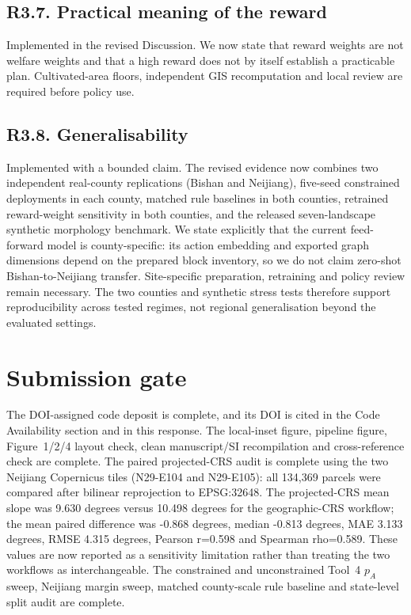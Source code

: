 ﻿\documentclass[11pt]{article}
\begin{document}
\subsection*{R3.7. Practical meaning of the reward}
Implemented in the revised Discussion. We now state that reward weights are not welfare weights and that a high reward does not by itself establish a practicable plan. Cultivated-area floors, independent GIS recomputation and local review are required before policy use.

\subsection*{R3.8. Generalisability}
Implemented with a bounded claim. The revised evidence now combines two independent real-county replications (Bishan and Neijiang), five-seed constrained deployments in each county, matched rule baselines in both counties, retrained reward-weight sensitivity in both counties, and the released seven-landscape synthetic morphology benchmark. We state explicitly that the current feed-forward model is county-specific: its action embedding and exported graph dimensions depend on the prepared block inventory, so we do not claim zero-shot Bishan-to-Neijiang transfer. Site-specific preparation, retraining and policy review remain necessary. The two counties and synthetic stress tests therefore support reproducibility across tested regimes, not regional generalisation beyond the evaluated settings.

\section*{Submission gate}
The DOI-assigned code deposit is complete, and its DOI is cited in the Code Availability section and in this response. The local-inset figure, pipeline figure, Figure~1/2/4 layout check, clean manuscript/SI recompilation and cross-reference check are complete. The paired projected-CRS audit is complete using the two Neijiang Copernicus tiles (N29-E104 and N29-E105): all 134,369 parcels were compared after bilinear reprojection to EPSG:32648. The projected-CRS mean slope was 9.630 degrees versus 10.498 degrees for the geographic-CRS workflow; the mean paired difference was -0.868 degrees, median -0.813 degrees, MAE 3.133 degrees, RMSE 4.315 degrees, Pearson r=0.598 and Spearman rho=0.589. These values are now reported as a sensitivity limitation rather than treating the two workflows as interchangeable. The constrained and unconstrained Tool~4 $p_A$ sweep, Neijiang margin sweep, matched county-scale rule baseline and state-level split audit are complete.
\end{document}
